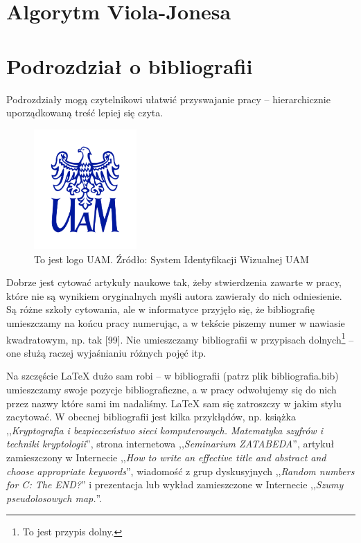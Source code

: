 \documentclass[12pt,a4paper,leqno,oneside,titlepage]{book}
\begin{document}
\section{Algorytm Viola-Jonesa}

\section{Podrozdział o bibliografii}

Podrozdziały mogą czytelnikowi ułatwić przyswajanie pracy -- hierarchicznie uporządkowaną treść lepiej się czyta.

\begin{figure}[h!]
  \centering
    \includegraphics[width=0.35\textwidth]{logo_wersja-podstawowa_granat_1.jpg}
  \caption{To jest logo UAM. Źródło: System Identyfikacji Wizualnej UAM \cite{SIW}}
\end{figure}

Dobrze jest cytować artykuły naukowe tak, żeby stwierdzenia zawarte w pracy, które nie są wynikiem oryginalnych myśli autora zawierały do nich odniesienie. Są różne szkoły cytowania, ale w informatyce przyjęło się, że bibliografię umieszczamy na końcu pracy numerując, a w tekście piszemy numer w nawiasie kwadratowym, np. tak [99]. Nie umieszczamy bibliografii w przypisach dolnych\footnote{To jest przypis dolny.} -- one służą raczej wyjaśnianiu różnych pojęć itp.

Na szczęście \LaTeX{} dużo sam robi -- w bibliografii (patrz plik bibliografia.bib) umieszczamy swoje pozycje bibliograficzne, a w pracy odwołujemy się do nich przez nazwy które sami im nadaliśmy. \LaTeX{} sam się zatroszczy w jakim stylu zacytować. W obecnej bibliografii jest kilka przykłądów, np. książka ,,\textit{Kryptografia i bezpieczeństwo sieci komputerowych. Matematyka szyfrów i techniki kryptologii}''\cite{Stallings11kryptografia}, strona internetowa ,,\textit{Seminarium ZATABEDA}''\cite{Gogolewski13seminarium}, artykuł zamieszczony w Internecie ,,\textit{How to write an effective title and abstract and choose appropriate keywords}''\cite{Rodrigues13howtowrite}, wiadomość z grup dyskusyjnych ,,\textit{Random numbers for C: The END?}''\cite{Marsaglia99randomnum} i prezentacja lub wykład zamieszczone w Internecie ,,\textit{Szumy pseudolosowych map.}''\cite{Hanc15szumy}.\\
\end{document}
